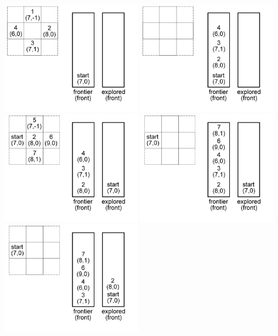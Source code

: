 \documentclass[12pt]{article}
\begin{document}
	\begin{center}
		\includegraphics[width=60mm]{images/breadth/pos01.png}
		\includegraphics[width=60mm]{images/breadth/pos02.png}
		\includegraphics[width=60mm]{images/breadth/pos03.png}
		\includegraphics[width=60mm]{images/breadth/pos04.png}
		\includegraphics[width=60mm]{images/breadth/pos05.png}
	\end{center}
\end{document}
